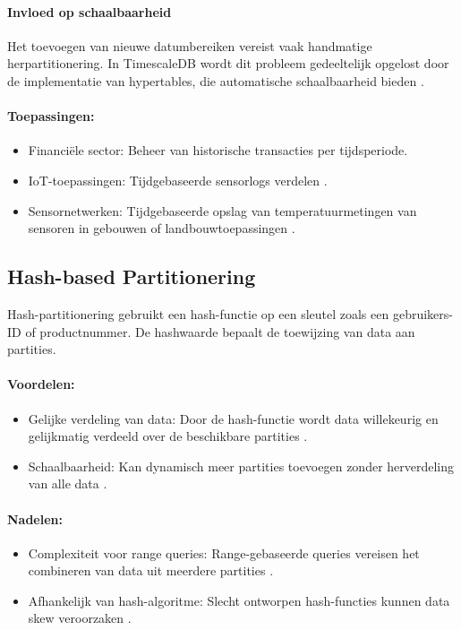 \paragraph{Invloed op schaalbaarheid} 
Het toevoegen van nieuwe datumbereiken vereist vaak handmatige herpartitionering. In TimescaleDB wordt dit probleem gedeeltelijk opgelost door de implementatie van hypertables, die automatische schaalbaarheid bieden \autocite{TimescaleDBDocumentation}.

\paragraph{Toepassingen:}
\begin{itemize}
    \item Financiële sector: Beheer van historische transacties per tijdsperiode.
    \item IoT-toepassingen: Tijdgebaseerde sensorlogs verdelen \autocite{Ponnusamy2024}.
    \item Sensornetwerken: Tijdgebaseerde opslag van temperatuurmetingen van sensoren in gebouwen of landbouwtoepassingen \autocite{Mahmud2020}.
\end{itemize}

\subsection{Hash-based Partitionering}
Hash-partitionering gebruikt een hash-functie op een sleutel zoals een gebruikers-ID of productnummer. De hashwaarde bepaalt de toewijzing van data aan partities.

\paragraph{Voordelen:}
\begin{itemize}
    \item Gelijke verdeling van data: Door de hash-functie wordt data willekeurig en gelijkmatig verdeeld over de beschikbare partities \autocite{Ponnusamy2024}.
    \item Schaalbaarheid: Kan dynamisch meer partities toevoegen zonder herverdeling van alle data \autocite{Mahmud2020}.
\end{itemize}

\paragraph{Nadelen:}
\begin{itemize}
    \item Complexiteit voor range queries: Range-gebaseerde queries vereisen het combineren van data uit meerdere partities \autocite{Kleppmann2017}.
    \item Afhankelijk van hash-algoritme: Slecht ontworpen hash-functies kunnen data skew veroorzaken \autocite{Ponnusamy2024}.
\end{itemize}

